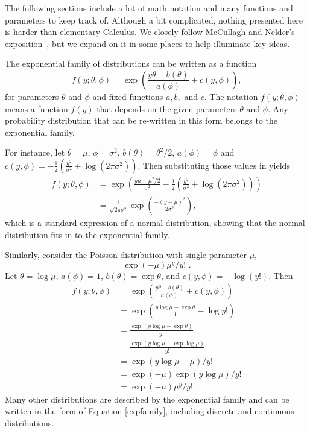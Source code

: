 \documentclass[10pt]{article} %
\begin{document}
The following sections include a lot of math notation and many functions and
parameters to keep track of. Although a bit complicated, nothing presented here
is harder than elementary Calculus. We closely follow McCullagh and Nelder's
exposition~\cite{MN}, but we expand on it in some places to help illuminate key
ideas.

The exponential family of distributions can be written as a function
\begin{equation}\label{expfamily}
f(y; \theta, \phi) = \exp\left(\frac{y\theta - b(\theta)}{a(\phi)} + c(y, \phi)\right),
\end{equation}
for parameters $\theta$ and $\phi$ and fixed functions $a,b,$ and $c$.
The notation $f(y; \theta, \phi)$ means a function $f(y)$ that
depends on the given parameters $\theta$ and $\phi$.
Any probability distribution that can be re-written in this form belongs
to the exponential family.

For instance, let
$\theta=\mu$, $\phi=\sigma^2$, $b(\theta)=\theta^2/2$, $a(\phi)=\phi$
and $c(y, \phi) = -\frac{1}{2}(\frac{y^2}{\sigma^2} + \log(2\pi\sigma^2))$.
Then substituting those values in yields
\begin{align*}
f(y; \theta, \phi) &=
  \exp\left(\frac{y\mu - \mu^2/2}{\sigma^2} - \frac{1}{2}\left(\frac{y^2}{\sigma^2} + \log(2\pi\sigma^2)\right)\right)\\
&= \frac{1}{\sqrt{2\pi\sigma^2}}\exp\left(\frac{-(y - \mu)^2}{2\sigma^2}\right),
\end{align*}
which is a standard expression of a normal distribution,
showing that the normal distribution fits in to the exponential
family.

Similarly, consider the Poisson distribution with single parameter
$\mu$,
\[
\exp(-\mu)\mu^y/{y!}\,\,.
\]
Let $\theta=\log\mu$, $a(\phi)=1$, $b(\theta)=\exp\theta$, and
$c(y, \phi)=-\log{(y!)}$. Then
\begin{align*}
f(y; \theta, \phi) &=  \exp\left(\frac{y\theta - b(\theta)}{a(\phi)} + c(y, \phi)\right)\\
&= \exp\left(\frac{y\log\mu - \exp\theta}{1} - \log y!\right)\\
&= \frac{\exp(y\log\mu - \exp\theta)}{y!}\\
&= \frac{\exp(y\log\mu - \exp\log\mu)}{y!}\\
&= \exp(y\log\mu - \mu)/y!\\
&= \exp{(-\mu)}\exp{(y\log\mu)}/y!\\
&= \exp(-\mu)\mu^y/y!\,\,.
\end{align*}
Many other distributions are described by the exponential family and can be
written in the form of Equation \ref{expfamily}, including discrete
and continuous distributions.
\end{document}
